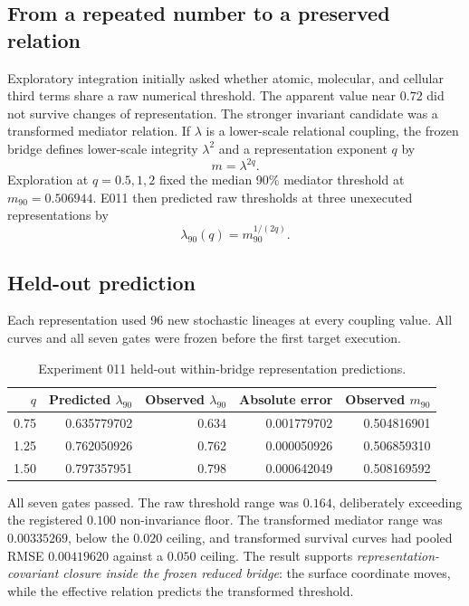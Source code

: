 \documentclass[11pt,a4paper]{article}
\begin{document}
\subsection{From a repeated number to a preserved relation}

Exploratory integration initially asked whether atomic, molecular, and cellular third terms share a raw numerical threshold. The apparent value near $0.72$ did not survive changes of representation. The stronger invariant candidate was a transformed mediator relation. If $\lambda$ is a lower-scale relational coupling, the frozen bridge defines lower-scale integrity $\lambda^2$ and a representation exponent $q$ by
\begin{equation}
 m=\lambda^{2q}.
 \label{eq:renormalized-bridge}
\end{equation}
Exploration at $q=0.5,1,2$ fixed the median 90\% mediator threshold at $m_{90}=0.506944$. E011 then predicted raw thresholds at three unexecuted representations by
\begin{equation}
 \lambda_{90}(q)=m_{90}^{1/(2q)}.
\end{equation}

\subsection{Held-out prediction}

Each representation used 96 new stochastic lineages at every coupling value. All curves and all seven gates were frozen before the first target execution.

\begin{table}[H]
\centering
\footnotesize
\caption{Experiment 011 held-out within-bridge representation predictions.}
\begin{tabular}{@{}rrrrr@{}}
\toprule
$q$ & Predicted $\lambda_{90}$ & Observed $\lambda_{90}$ & Absolute error & Observed $m_{90}$ \\
\midrule
0.75 & 0.635779702 & 0.634 & 0.001779702 & 0.504816901 \\
1.25 & 0.762050926 & 0.762 & 0.000050926 & 0.506859310 \\
1.50 & 0.797357951 & 0.798 & 0.000642049 & 0.508169592 \\
\bottomrule
\end{tabular}
\end{table}

All seven gates passed. The raw threshold range was $0.164$, deliberately exceeding the registered $0.100$ non-invariance floor. The transformed mediator range was $0.00335269$, below the $0.020$ ceiling, and transformed survival curves had pooled RMSE $0.00419620$ against a $0.050$ ceiling. The result supports \emph{representation-covariant closure inside the frozen reduced bridge}: the surface coordinate moves, while the effective relation predicts the transformed threshold.
\end{document}
